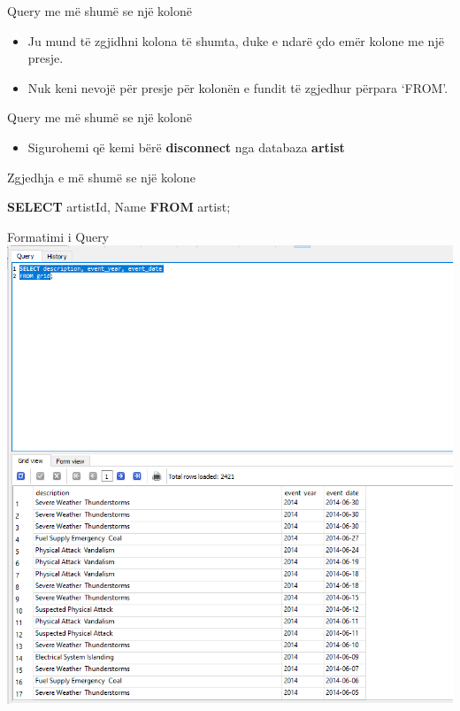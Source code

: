 \documentclass[
  ignorenonframetext,
]{beamer}
\newenvironment{Shaded}{\begin{snugshade}}{\end{snugshade}}
\newcommand{\KeywordTok}[1]{\textcolor[rgb]{0.13,0.29,0.53}{\textbf{#1}}}
\newcommand{\NormalTok}[1]{#1}
\providecommand{\tightlist}{%
  \setlength{\itemsep}{0pt}\setlength{\parskip}{0pt}}
\begin{document}
\begin{frame}{Query me më shumë se një kolonë}
\label{query-me-muxeb-shumuxeb-se-njuxeb-kolonuxeb}
\begin{itemize}
\item
  Ju mund të zgjidhni kolona të shumta, duke e ndarë çdo emër kolone me
  një presje.
\item
  Nuk keni nevojë për presje për kolonën e fundit të zgjedhur përpara
  `FROM'.
\end{itemize}
\end{frame}

\begin{frame}{Query me më shumë se një kolonë}
\label{query-me-muxeb-shumuxeb-se-njuxeb-kolonuxeb-1}
\begin{itemize}
\tightlist
\item
  Sigurohemi që kemi bërë \textbf{disconnect} nga databaza
  \textbf{artist}
\end{itemize}
\end{frame}

\begin{frame}[fragile]{Zgjedhja e më shumë se një kolone}
\label{zgjedhja-e-muxeb-shumuxeb-se-njuxeb-kolone}

\begin{Shaded}
\begin{Highlighting}[]
\KeywordTok{SELECT}\NormalTok{ artistId, Name}
\KeywordTok{FROM}\NormalTok{ artist;}
\end{Highlighting}
\end{Shaded}
\end{frame}

\begin{frame}{Formatimi i Query}
\label{formatimi-i-query}
\includegraphics{./Figs/sql14.png}
\end{frame}
\end{document}
